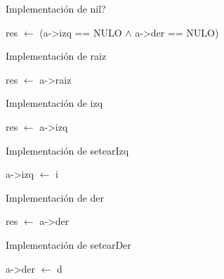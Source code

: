 \begin{Algoritmos}

\begin{algorithm}
\caption{Implementaci\'on de nil?}
\begin{algorithmic}[0]
	\State res $\gets$ (a->izq == NULO $\wedge$ a->der == NULO)
\EndFunction
\end{algorithmic}
\end{algorithm}

\begin{algorithm}
\caption{Implementaci\'on de raiz}
\begin{algorithmic}[0]
	\State res $\gets$ a->raiz
\EndFunction
\end{algorithmic}
\end{algorithm}

\begin{algorithm}
\caption{Implementaci\'on de izq}
\begin{algorithmic}[0]
	\State res $\gets$ a->izq
\EndFunction
\end{algorithmic}
\end{algorithm}

\begin{algorithm}
\caption{Implementaci\'on de setearIzq}
\begin{algorithmic}[0]
	\State a->izq $\gets$ i
\EndFunction
\end{algorithmic}
\end{algorithm}

\begin{algorithm}
\caption{Implementaci\'on de der}
\begin{algorithmic}[0]
	\State res $\gets$ a->der
\EndFunction
\end{algorithmic}
\end{algorithm}

\begin{algorithm}
\caption{Implementaci\'on de setearDer}
\begin{algorithmic}[0]
	\State a->der $\gets$ d
\EndFunction
\end{algorithmic}
\end{algorithm}


\end{Algoritmos}
